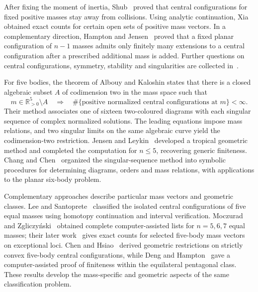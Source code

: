 \documentclass[Threeside,11pt]{article}
\theoremstyle{definition}
\theoremstyle{remark}
\numberwithin{equation}{section}
\theoremstyle{remark}
\newcommand{\Rp}{\mathbb{R}_{>0}}
\begin{document}
After fixing the moment of inertia, Shub~\cite{Shub71} proved that central
configurations for fixed positive masses stay away from collisions.
Using analytic continuation, Xia~\cite{Xia91} obtained exact counts for
certain open sets of positive mass vectors. In a complementary direction,
Hampton and Jensen~\cite{HJ15} proved that a fixed planar configuration of
$n-1$ masses admits only finitely many extensions to a central configuration
after a prescribed additional mass is added. Further questions on central
configurations, symmetry, stability and singularities are collected
in~\cite{ACS12}.

For five bodies, the theorem of Albouy and Kaloshin states that there is a
closed algebraic subset $A$ of codimension two in the mass space such that
\[
 m\in\Rp^5\setminus A
 \quad\Longrightarrow\quad
 \#\{\text{positive normalized central configurations at }m\}<\infty.
\]
Their method associates one of sixteen two-coloured diagrams with each singular
sequence of complex normalized solutions. The leading equations impose mass
relations, and two singular limits on the same algebraic curve yield the
codimension-two restriction. Jensen and Leykin~\cite{JL} developed a tropical
geometric method and completed the computation for $n\le5$, recovering generic
finiteness. Chang and Chen~\cite{CC1,CC2} organized the singular-sequence method
into symbolic procedures for determining diagrams, orders and mass relations,
with applications to the planar six-body problem.

Complementary approaches describe particular mass vectors and geometric
classes. Lee and Santoprete~\cite{LS} classified the isolated central
configurations of five equal masses using homotopy continuation and interval
verification. Moczurad and Zgliczy\'nski~\cite{MZ19} obtained complete
computer-assisted lists for $n=5,6,7$ equal masses; their later work~\cite{MZ26}
gives exact counts for selected five-body mass vectors on exceptional loci.
Chen and Hsiao~\cite{CH18} derived geometric restrictions on strictly convex
five-body central configurations, while Deng and Hampton~\cite{DH} gave a
computer-assisted proof of finiteness within the equilateral pentagonal class. These results develop the
mass-specific and geometric aspects of the same classification problem.
\end{document}
